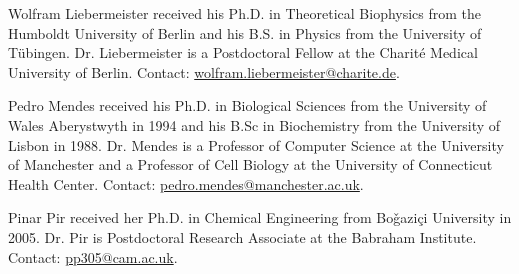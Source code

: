 \documentclass[journal,transmag]{IEEEtran}
\begin{document}
\begin{IEEEbiography}{Wolfram Liebermeister}
received his Ph.D. in Theoretical Biophysics from the Humboldt University of Berlin and his B.S. in Physics from the University of T\"ubingen.
Dr. Liebermeister is a Postdoctoral Fellow at the Charit\'e Medical University of Berlin.
Contact: \href{mailto:wolfram.liebermeister@charite.de}{wolfram.liebermeister@charite.de}.
\end{IEEEbiography}

\begin{IEEEbiography}{Pedro Mendes}
received his Ph.D. in Biological Sciences from the University of Wales Aberystwyth in 1994 and his B.Sc in Biochemistry from the University of Lisbon in 1988.
Dr. Mendes is a Professor of Computer Science at the University of Manchester and a Professor of Cell Biology at the University of Connecticut Health Center.
Contact: \href{mailto:pedro.mendes@manchester.ac.uk}{pedro.mendes@manchester.ac.uk}.
\end{IEEEbiography}

\begin{IEEEbiography}{Pinar Pir}
received her Ph.D. in Chemical Engineering from Bo\v{g}azi\c{c}i University in 2005. 
Dr. Pir is Postdoctoral Research Associate at the Babraham Institute.
Contact: \href{mailto:pp305@cam.ac.uk}{pp305@cam.ac.uk}.
\end{IEEEbiography}
\end{document}
